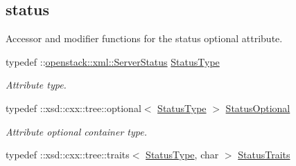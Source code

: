 \subsection*{status}
\label{_amgrp9acb44549b41563697bb490144ec6258}
Accessor and modifier functions for the status optional attribute. \begin{DoxyCompactItemize}
\item 
\hypertarget{classopenstack_1_1xml_1_1Server_aabc5ea464e1328f87ecf6f03fa75e6c7}{
typedef ::\hyperlink{classopenstack_1_1xml_1_1ServerStatus}{openstack::xml::ServerStatus} \hyperlink{classopenstack_1_1xml_1_1Server_aabc5ea464e1328f87ecf6f03fa75e6c7}{StatusType}}
\label{classopenstack_1_1xml_1_1Server_aabc5ea464e1328f87ecf6f03fa75e6c7}

\begin{DoxyCompactList}\small\item\em Attribute type. \item\end{DoxyCompactList}\item 
\hypertarget{classopenstack_1_1xml_1_1Server_a68b70c69e4ffbd43b5700bd382ab7172}{
typedef ::xsd::cxx::tree::optional$<$ \hyperlink{classopenstack_1_1xml_1_1ServerStatus}{StatusType} $>$ \hyperlink{classopenstack_1_1xml_1_1Server_a68b70c69e4ffbd43b5700bd382ab7172}{StatusOptional}}
\label{classopenstack_1_1xml_1_1Server_a68b70c69e4ffbd43b5700bd382ab7172}

\begin{DoxyCompactList}\small\item\em Attribute optional container type. \item\end{DoxyCompactList}\item 
\hypertarget{classopenstack_1_1xml_1_1Server_a9feed68a82f691ba3622c62b36425184}{
typedef ::xsd::cxx::tree::traits$<$ \hyperlink{classopenstack_1_1xml_1_1ServerStatus}{StatusType}, char $>$ \hyperlink{classopenstack_1_1xml_1_1Server_a9feed68a82f691ba3622c62b36425184}{StatusTraits}}
\label{classopenstack_1_1xml_1_1Server_a9feed68a82f691ba3622c62b36425184}


\end{DoxyCompactItemize}
